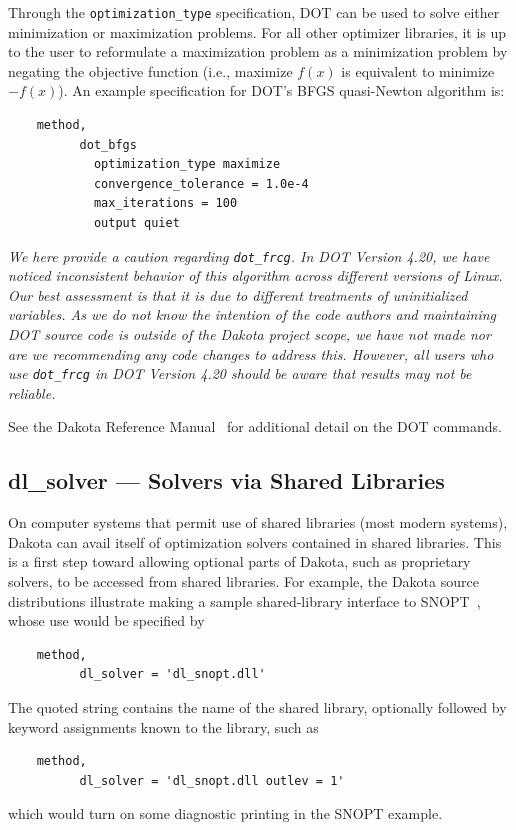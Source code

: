 Through the \texttt{optimization\_type} specification, DOT can be used
to solve either minimization or maximization problems. For all other
optimizer libraries, it is up to the user to reformulate a
maximization problem as a minimization problem by negating the
objective function (i.e., maximize $f(x)$ is equivalent to minimize
$-f(x)$). An example specification for DOT's BFGS quasi-Newton
algorithm is:
\begin{small}
\begin{verbatim}
    method,
          dot_bfgs
            optimization_type maximize
            convergence_tolerance = 1.0e-4
            max_iterations = 100
            output quiet
\end{verbatim}
\end{small}

\emph{We here provide a caution regarding \texttt{dot\_frcg}. In DOT
Version 4.20, we have noticed inconsistent behavior of this algorithm
across different versions of Linux. Our best assessment is that it is
due to different treatments of uninitialized variables. As we do not
know the intention of the code authors and maintaining DOT source code
is outside of the Dakota project scope, we have not made nor are we
recommending any code changes to address this. However, all users who
use \texttt{dot\_frcg} in DOT Version 4.20 should be aware that
results may not be reliable.}

See the Dakota
Reference Manual~\cite{RefMan} for additional detail on the DOT
commands. 

\subsection{dl\_solver --- Solvers via Shared Libraries}\label{opt:software:dlsolver}

On computer systems that permit use of shared libraries (most modern systems),
Dakota can avail itself of optimization solvers contained in shared libraries.
This is a first step toward allowing optional parts of Dakota, such as
proprietary solvers, to be accessed from shared libraries. For example,
the Dakota source distributions illustrate making
a sample shared-library interface to SNOPT~\cite{GilMS05},
whose use would be specified by
\begin{small}
\begin{verbatim}
    method,
          dl_solver = 'dl_snopt.dll'
\end{verbatim}
\end{small}
The quoted string contains the name of the shared library, optionally
followed by keyword assignments known to the library, such as
\begin{small}
\begin{verbatim}
    method,
          dl_solver = 'dl_snopt.dll outlev = 1'
\end{verbatim}
\end{small}
which would turn on some diagnostic printing in the SNOPT example.

